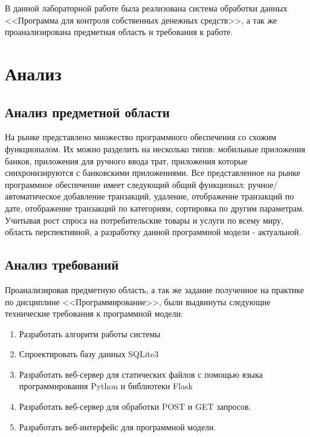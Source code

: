 \documentclass[14pt]{extreport}
\begin{document}
\pagestyle{empty} %



\pagestyle{plain} %
\tableofcontents
\intro\label{intro} 

В данной лабораторной работе была реализована система обработки данных <<Программа для контроля собственных денежных средств>>, а так же проанализирована предметная область и требования к работе.

\chapter{Анализ}
\section{Анализ предметной области}

На рынке представлено множество программного обеспечения со схожим функционалом. Их можно разделить на несколько типов: мобильные приложения банков, приложения для ручного ввода трат, приложения которые синхронизируются с банковскими приложениями. Все представленное на рынке программное обеспечение имеет следующий общий функционал: ручное/автоматическое добавление транзакций, удаление, отображение транзакций по дате, отображение транзакций по категориям, сортировка по другим параметрам. Учитывая рост спроса на потребительские товары и услуги по всему миру, область перспективной, а разработку данной программной модели - актуальной.

\section{Анализ требований}

Проанализировав предметную область, а так же задание полученное на практике по дисциплине <<Программирование>>, были выдвинуты следующие технические требования к программной модели: 
\begin{enumerate}
    \item Разработать алгоритм работы системы
    \item Спроектировать базу данных SQLite3
    \item Разработать веб-сервер для статических файлов с помощью языка программирования Python и библиотеки Flask
    \item Разработать веб-сервер для обработки POST и GET запросов.
    \item Разработать веб-интерфейс для программной модели.
\end{enumerate}
\end{document}
